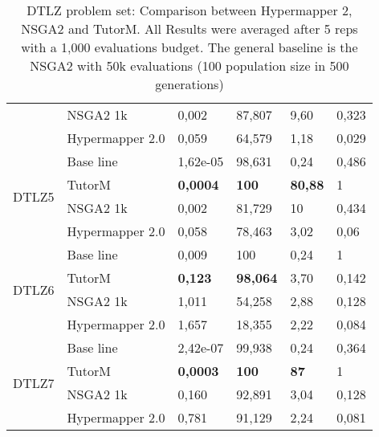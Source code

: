 \begin{table}[]
{\begin{tabular}{@{}llllll@{}}
    & NSGA2 1k        & 0,002           & 87,807          & 9,60           & 0,323 \\ \cmidrule(l){2-6} 
    & Hypermapper 2.0 & 0,059           & 64,579          & 1,18           & 0,029 \\ \midrule
\multirow{4}{*}{DTLZ5} & Base line       & 1,62e-05        & 98,631          & 0,24           & 0,486 \\ \cmidrule(l){2-6} 
    & TutorM          & \textbf{0,0004} & \textbf{100}    & \textbf{80,88} & 1     \\ \cmidrule(l){2-6} 
    & NSGA2 1k        & 0,002           & 81,729          & 10          & 0,434 \\ \cmidrule(l){2-6} 
    & Hypermapper 2.0 & 0,058           & 78,463          & 3,02           & 0,06 \\ \midrule
\multirow{4}{*}{DTLZ6} & Base line       & 0,009           & 100             & 0,24           & 1     \\ \cmidrule(l){2-6} 
    & TutorM          & \textbf{0,123}  & \textbf{98,064} & 3,70           & 0,142 \\ \cmidrule(l){2-6} 
    & NSGA2 1k        & 1,011           & 54,258          & 2,88           & 0,128 \\ \cmidrule(l){2-6} 
    & Hypermapper 2.0 & 1,657           & 18,355          & 2,22           & 0,084 \\ \midrule
\multirow{4}{*}{DTLZ7} & Base line       & 2,42e-07        & 99,938          & 0,24           & 0,364 \\ \cmidrule(l){2-6} 
    & TutorM          & \textbf{0,0003} & \textbf{100}    & \textbf{87} & 1     \\ \cmidrule(l){2-6} 
    & NSGA2 1k        & 0,160           & 92,891          & 3,04           & 0,128 \\
    & Hypermapper 2.0 & 0,781           & 91,129          & 2,24           & 0,081 \\ \cmidrule(l){2-6} 
\end{tabular}%
    }
    \caption{DTLZ problem set: Comparison between Hypermapper 2, NSGA2 and TutorM.  All Results were averaged after 5 reps with a 1,000 evaluations budget.
    The general baseline is the NSGA2 with 50k evaluations (100 population size in 500 generations)}
    \end{table}
